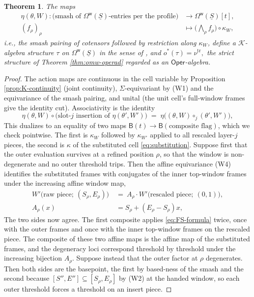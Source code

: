 \documentclass[12pt]{amsart}
\newtheorem{theorem}[subsection]{Theorem}
\theoremstyle{definition}
\theoremstyle{remark}
\newcommand{\Oper}{\mathsf{Oper}}
\newcommand{\uS}{\underline{S}}
\newcommand{\BC}{\mathsf{B}}                     %
\newcommand{\Omw}{\Omega^{\mathsf{w}}}           %
\newcommand{\Kop}{\mathcal{K}}                   %
\begin{document}
\begin{theorem}\label{thm:taut}
The maps
\begin{align*}
\eta(\theta, W)\colon \big(\text{smash of } \Omw(\uS)\text{-entries per the profile}\big) &\longrightarrow \Omw(\uS)[t], \\
(f_\rho)_\rho &\longmapsto \big({\textstyle\bigwedge}_\rho f_\rho\big)\circ \kappa_W,
\end{align*}
i.e., the smash pairing of cotensors followed by restriction along $\kappa_W$, define a $\Kop$-algebra structure $\tau$ on $\Omw(\uS)$ in the sense of \cite[Definition 6.32]{Clark-1}, and $o^{*}(\tau) = \nu^{\mathrm{tr}},$ the strict structure of Theorem \ref{thm:omw-operad} regarded as an $\Oper$-algebra.
\end{theorem}

\begin{proof}
The action maps are continuous in the cell variable by Proposition \ref{prop:K-continuity} (joint continuity), $\Sigma$-equivariant by (W1) and the equivariance of the smash pairing, and unital (the unit cell's full-window frames give the identity cut). Associativity is the identity
\begin{equation}\label{eq:action-assoc}
    \eta(\theta, W)\circ\big(\text{slot-}j \text{ insertion of } \eta(\theta',W')\big) \;=\; \eta\big((\theta,W)\circ_j(\theta',W')\big),
\end{equation}
This dualizes to an equality of two maps $\BC(t)\to \BC(\text{composite flag})$, which we check pointwise. The first is $\kappa_W$ followed by $\kappa_{W'}$ applied to all rescaled layer-$j$ pieces, the second is $\kappa$ of the substituted cell \eqref{eq:substitution}. Suppose first that the outer evaluation survives at a refined position $\rho$, so that the window is non-degenerate and no outer threshold trips. Then the affine equivariance (W4) identifies the substituted frames with conjugates of the inner top-window frames under the increasing affine window map,
\begin{align*}
W'\big( \text{raw piece};\ (S_\rho, E_\rho) \big) \ &=\ A_\rho\cdot W'\big( \text{rescaled piece};\ (0,1)\big), \\
A_\rho(x) &= S_\rho + (E_\rho - S_\rho)x,
\end{align*}
The two sides now agree. The first composite applies \eqref{eq:FS-formula} twice, once with the outer frames and once with the inner top-window frames on the rescaled piece. The composite of these two affine maps is the affine map of the substituted frames, and the degeneracy loci correspond threshold by threshold under the increasing bijection $A_\rho$. Suppose instead that the outer factor at $\rho$ degenerates. Then both sides are the basepoint, the first by based-ness of the smash and the second because $[S'',E'']\subseteq[S_\rho,E_\rho]$ by (W2) at the handed window, so each outer threshold forces a threshold on an insert piece.


\end{proof}
\end{document}
